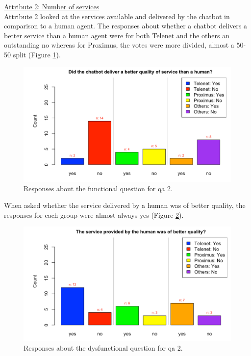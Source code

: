 \break
\break
\break
\ul{Attribute 2: Number of services}\\
\break
Attribute 2 looked at the services available and delivered by the chatbot in comparison to a human agent. The responses about whether a chatbot delivers a better service than a human agent were for both Telenet and the others an outstanding no whereas for Proximus, the votes were more divided, almost a 50-50 split (Figure \ref{fig:Q2}).\\
\begin{figure}[!htb]
	\centering
	\includegraphics[width=375pt]{../LaTeX/Figures/Comparative/Q2.png}
	\caption{Responses about the functional question for \acrshort{qa} 2.}\label{fig:Q2}
\end{figure}
\break
When asked whether the service delivered by a human was of better quality, the responses for each group were almost always yes (Figure \ref{fig:DQ2}).\\
\begin{figure}[!htb]
	\centering
	\includegraphics[width=375pt]{../LaTeX/Figures/Comparative/DQ2.png}
	\caption{Responses about the dysfunctional question for \acrshort{qa} 2.}\label{fig:DQ2}
\end{figure}
